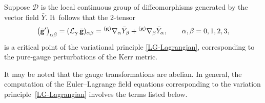 \documentclass[pdftex]{sigma}
\def\grad{{\nabla}}%
\newcommand{\leftexp}[2]{{\vphantom{#2}}^{#1}{#2}}
\def \a{\alpha}
\def \b {\beta}
\renewcommand{\gg}{{\bf g}}
\renewcommand{\a}{\alpha}
\renewcommand{\b}{\beta}
\numberwithin{equation}{section}
\begin{document}
Suppose $\mathcal{D}$ is the local continuous group of diffeomorphisms generated by the vector field $\bar{Y}$. It~follows that the 2-tensor
\begin{align*}
\bigl(\bar{\gg}'\bigr)_{\a \b} = (\mathcal{L}_{\bar{Y}} \bar{\gg})_{\a \b} = \leftexp{(\gg)}{\grad}_\a \bar{Y}_\b + \leftexp{(\gg)}{\grad}_\b \bar{Y}_\a, \qquad \a, \b = 0, 1, 2, 3,
\end{align*}
is a critical point of the variational principle \eqref{LG-Lagrangian}, corresponding to the pure-gauge perturbations of the Kerr metric.

 It may be noted that the gauge transformations are abelian. In general, the computation of the Euler--Lagrange field equations corresponding to the variation principle~\eqref{LG-Lagrangian} involves the terms listed below.
\end{document}

